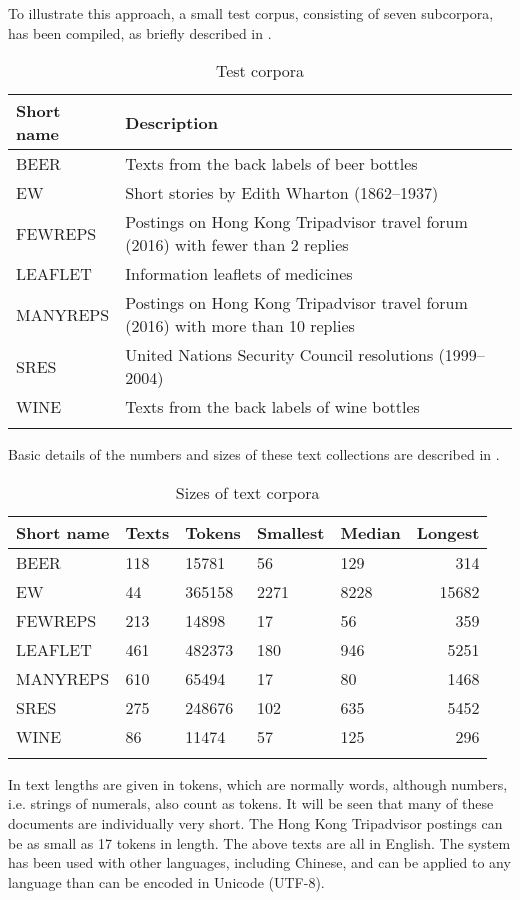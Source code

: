\documentclass[output=paper]{langscibook}
\begin{document}
To illustrate this approach, a small test corpus, consisting of seven subcorpora, has been compiled, as briefly described in .

\begin{table}
\caption{Test corpora\label{tab:forsyth:1}}
\begin{tabularx}{\textwidth}{lQ}
\lsptoprule
Short name & Description\\\midrule
BEER & Texts from the back labels of beer bottles\\
EW & Short stories by Edith Wharton (1862--1937)\\
FEWREPS & Postings on Hong Kong Tripadvisor travel forum (2016) with fewer than 2 replies\\
LEAFLET & Information leaflets of medicines\\
MANYREPS & Postings on Hong Kong Tripadvisor travel forum (2016) with more than 10 replies\\
SRES & United Nations Security Council resolutions (1999--2004)\\
WINE & Texts from the back labels of wine bottles\\
\lspbottomrule
\end{tabularx}
\end{table}

Basic details of the numbers and sizes of these text collections are described in .

\begin{table}
\small
\caption{Sizes of text corpora\label{tab:forsyth:2}}
\begin{tabularx}{\textwidth}{lYYYYr}
\lsptoprule
Short name & Texts & Tokens & Smallest & Median & Longest\\
\midrule
BEER &  118 &  15781 &  56 &  129 &  314\\
EW &  44 &  365158 &  2271 &  8228 &  15682\\
FEWREPS &  213 &  14898 &  17 &  56 &  359\\
LEAFLET &  461 &  482373 &  180 &  946 &  5251\\
MANYREPS &  610 &  65494 &  17 &  80 &  1468\\
SRES &  275 &  248676 &  102 &  635 &  5452\\
WINE &  86 &  11474 &  57 &  125 &  296\\
\lspbottomrule
\end{tabularx}
\end{table}

In  text lengths are given in tokens, which are normally words, although numbers, i.e. strings of numerals, also count as tokens. It will be seen that many of these documents are individually very short. The Hong Kong Tripadvisor postings can be as small as 17 tokens in length. The above texts are all in English. The system has been used with other languages, including Chinese, and can be applied to any language than can be encoded in Unicode (UTF-8).
\end{document}

